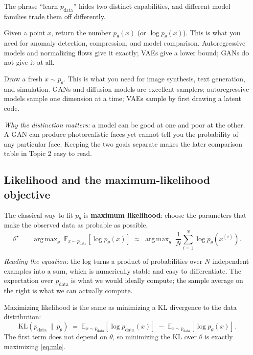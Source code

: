 \documentclass[11pt]{article}
\newcommand{\E}{\mathbb{E}}
\newcommand{\KL}{\mathrm{KL}}
\DeclareMathOperator*{\argmax}{arg\,max}
\theoremstyle{remark}
\begin{document}
The phrase ``learn $p_{\text{data}}$'' hides two distinct capabilities, and different model families trade them off differently.

\begin{description}[leftmargin=1.5em]
  \item[Density estimation.] Given a point $x$, return the number $p_\theta(x)$ (or $\log p_\theta(x)$). This is what you need for anomaly detection, compression, and model comparison. Autoregressive models and normalizing flows give it exactly; VAEs give a lower bound; GANs do not give it at all.
  \item[Sampling.] Draw a fresh $x \sim p_\theta$. This is what you need for image synthesis, text generation, and simulation. GANs and diffusion models are excellent samplers; autoregressive models sample one dimension at a time; VAEs sample by first drawing a latent code.
\end{description}

\noindent\textit{Why the distinction matters:} a model can be good at one and poor at the other. A GAN can produce photorealistic faces yet cannot tell you the probability of any particular face. Keeping the two goals separate makes the later comparison table in Topic 2 easy to read.

\subsection{Likelihood and the maximum-likelihood objective}

The classical way to fit $p_\theta$ is \textbf{maximum likelihood}: choose the parameters that make the observed data as probable as possible,
\begin{equation}
\theta^{\star} \;=\; \argmax_{\theta}\; \E_{x \sim p_{\text{data}}}\!\left[\log p_\theta(x)\right]
\;\approx\; \argmax_{\theta}\; \frac{1}{N}\sum_{i=1}^{N} \log p_\theta\!\left(x^{(i)}\right).
\label{eq:mle}
\end{equation}

\noindent\textit{Reading the equation:} the log turns a product of probabilities over $N$ independent examples into a sum, which is numerically stable and easy to differentiate. The expectation over $p_{\text{data}}$ is what we would ideally compute; the sample average on the right is what we can actually compute.

Maximizing likelihood is the same as minimizing a KL divergence to the data distribution:
\begin{equation}
\KL\!\left(p_{\text{data}} \,\|\, p_\theta\right)
\;=\; \E_{x \sim p_{\text{data}}}\!\left[\log p_{\text{data}}(x)\right] \;-\; \E_{x \sim p_{\text{data}}}\!\left[\log p_\theta(x)\right].
\label{eq:kl}
\end{equation}
The first term does not depend on $\theta$, so minimizing the KL over $\theta$ is exactly maximizing \eqref{eq:mle}.
\end{document}
